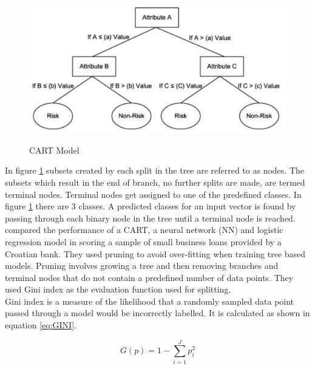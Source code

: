 \vspace{10pt}

\begin{figure}[!htb]
\centering
\includegraphics[width = \textwidth]{images/CART.png}
\caption{CART Model}
\parencite{DecTreesBrieman}
\label{fig:CART}
\end{figure}

\vspace{10pt}

In figure \ref{fig:CART} subsets created by each split in the tree are referred to as nodes. The subsets which result in the end of branch, no further splits are made, are termed terminal nodes. Terminal nodes get assigned to one of the predefined classes. In figure \ref{fig:CART} there are 3 classes. A predicted classes for an input vector is found by passing through each binary node in the tree until a terminal node is reached. \\

\textcite{DecTreesZekic} compared the performance of a CART, a neural network (NN) and logistic regression model in scoring a sample of small business loans provided by a Croatian bank. They used pruning to avoid over-fitting when training tree based models. Pruning involves growing a tree and then removing branches and terminal nodes that do not contain a predefined number of data points. They used Gini index as the evaluation function used for splitting. \\

Gini index is a measure of the likelihood that a randomly sampled data point passed through a model would be incorrectly labelled. It is calculated as shown in equation \ref{eq:GINI}.

\vspace{10pt}

\begin{equation} \label{eq:GINI}
G(p) = 1 - \sum_{i=1}^{J}p_{i}^2
\end{equation}

